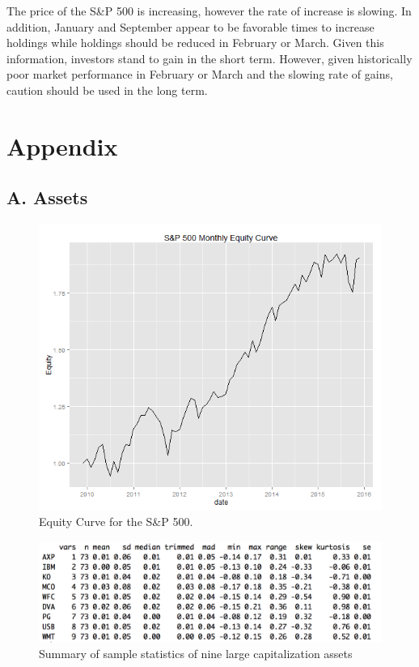 \documentclass[10pt]{article_simple}
\begin{document}
The price of the S\&P 500 is increasing, however the rate of increase is slowing. In addition, January and September appear to be favorable times to increase holdings while holdings should be reduced in February or March. Given this information, investors stand to gain in the short term. However, given historically poor market performance in February or March and the slowing rate of gains, caution should be used in the long term.

\newpage

\section*{Appendix}

\subsection*{A. Assets}
\begin{figure}[H]
	\centering
  	\includegraphics[width=.85\linewidth]{SP500_Equity_Curve}
  	\centering
  	\caption{Equity Curve for the S\&P 500.}
\end{figure}

\begin{figure}[H]
	\centering
  	\includegraphics[width=.85\linewidth]{means_sd_skewness_kurtosis}
  	\centering
  	\caption{Summary of sample statistics of nine large capitalization assets}
\end{figure}
\end{document}
